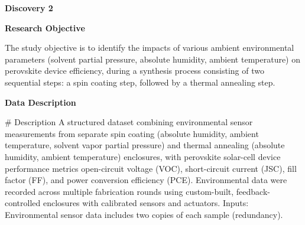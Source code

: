\documentclass{article}
\begin{document}
\noindent \textbf{Discovery 2} \par
\noindent \textbf{Research Objective} \par
The study objective is to identify the impacts of various ambient environmental parameters (solvent partial
pressure, absolute humidity, ambient temperature) on perovskite device efficiency, during a synthesis process
consisting of two sequential steps: a spin coating step, followed by a thermal annealing step. \par
\noindent \textbf{Data Description} \par
\# Description
A structured dataset combining environmental sensor measurements from separate spin coating (absolute humidity, ambient temperature, solvent vapor partial pressure) and thermal annealing (absolute humidity, ambient temperature) enclosures, with perovskite solar-cell device performance metrics open-circuit voltage (VOC), short-circuit current (JSC), fill factor (FF), and power conversion efficiency (PCE). Environmental data were recorded across multiple fabrication rounds using custom-built, feedback-controlled enclosures with calibrated sensors and actuators. Inputs: Environmental sensor data includes two copies of each sample (redundancy).
\end{document}
